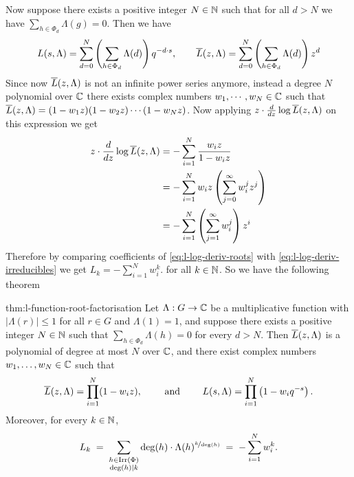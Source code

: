 Now suppose there exists a positive integer $N\in\mathbb{N}$ such that for all $d>N$ we have $\sum_{h\in\Phi_d}\Lambda(g)=0$. Then we have $$L(s,\Lambda)=\sum_{d=0}^N \left(\sum_{h\in\Phi_d}\Lambda(d)\right)q^{-d\cdot s},\qquad  \overline{L}(z,\Lambda)=\sum_{d=0}^N \left(\sum_{h\in\Phi_d}\Lambda(d)\right)z^d$$
Since now $\overline{L}(z,\Lambda)$ is not an infinite power series anymore, instead a degree $N$ polynomial over $\mathbb{C}$ there exists complex numbers $w_1,\cdots, w_N\in\mathbb{C}$ such that $\overline{L}(z,\Lambda)=(1-w_1 z)(1-w_2 z)\cdots (1-w_N z)$. Now applying $z\cdot \frac{d}{dz}\log \overline{L}(z,\Lambda)$ on this expression we get \begin{align}
  z\cdot \frac{d}{dz}\log \overline{L}(z,\Lambda) & = -\sum_{i=1}^N\frac{w_iz}{1-w_iz}\notag\\
  & = -\sum_{i=1}^N w_iz\left(\sum_{j=0}^{\infty}w_i^jz^j\right)\notag\\
  & = -\sum_{i=1}^N\left(\sum_{j=1}^{\infty}w_i^j\right)z^i \label{eq:l-log-deriv-roots}
\end{align}
Therefore by comparing coefficients of \eqref{eq:l-log-deriv-roots} with \eqref{eq:l-log-deriv-irreducibles} we get $L_k=-\sum_{i=1}^{N}w_i^k$. for all $k\in\mathbb{N}$. So we have the following theorem
\begin{Theorem}{}{thm:l-function-root-factorisation}%
  Let $\Lambda:G\to\mathbb{C}$ be a multiplicative function with $|\Lambda(r)|\leq 1$ for all $r\in G$ and $\Lambda(1)=1$, and suppose there exists a positive integer $N\in\mathbb{N}$ such that $\sum_{h\in\Phi_d}\Lambda(h)=0$ for every $d>N$. Then $\overline{L}(z,\Lambda)$ is a polynomial of degree at most $N$ over $\mathbb{C}$, and there exist complex numbers $w_1,\dots,w_N\in\mathbb{C}$ such that
  $$\overline{L}(z,\Lambda)=\prod_{i=1}^{N}(1-w_iz), \qquad\text{ and }\qquad L(s,\Lambda)=\prod_{i=1}^{N}\left(1-w_iq^{-s}\right).$$
  Moreover, for every $k\in\mathbb{N}$,
  $$L_k\;=\;\sum_{\substack{h\in\operatorname{Irr}(\Phi)\\ \deg(h)\mid k}}\deg(h)\cdot \Lambda(h)^{\nicefrac{k}{\deg(h)}}\;=\;-\sum_{i=1}^{N}w_i^k.$$
\end{Theorem}